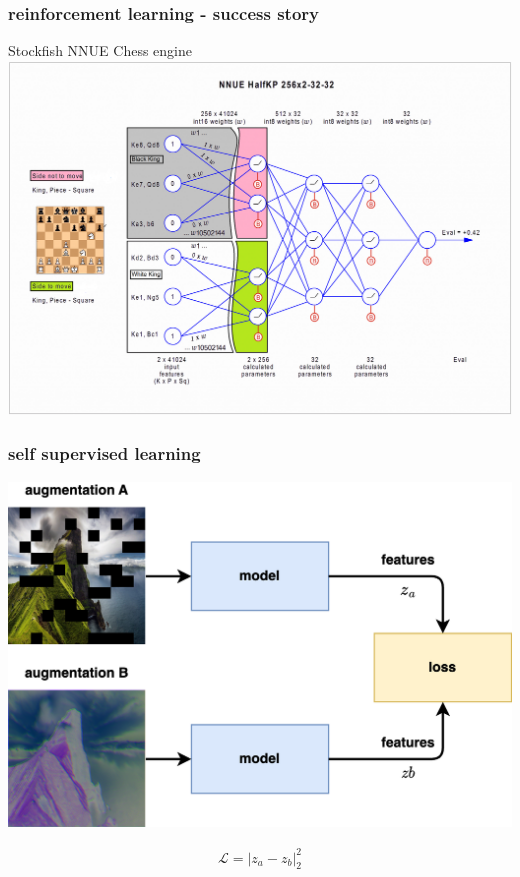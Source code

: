 \documentclass{beamer}
\begin{document}
\begin{frame}
  \frametitle{reinforcement learning - success story}
  Stockfish NNUE Chess engine \\
  \centering
  \includegraphics[scale=0.18]{../images/nnue.png}
    
\end{frame}


\begin{frame}
\frametitle{self supervised learning}

  \centering
  \includegraphics[scale=0.8]{../diagrams/self_supervised/self_supervised-basic.png}

  \begin{align*}
    \mathcal{L} = \vert z_a - z_b \vert^2_2
  \end{align*}

\end{frame}
\end{document}
